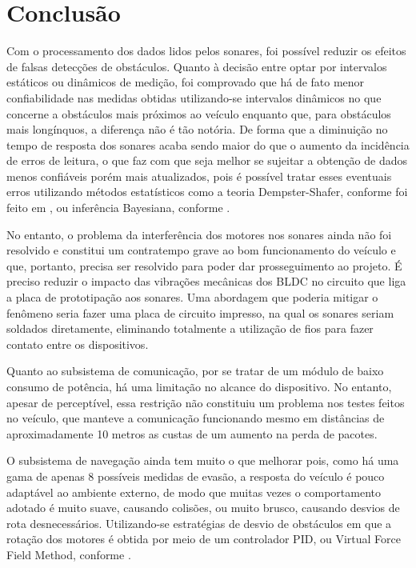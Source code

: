 \chapter{Conclusão}

Com o processamento dos dados lidos pelos sonares, foi possível reduzir os efeitos
de falsas detecções de obstáculos. Quanto à decisão entre optar por intervalos estáticos
ou dinâmicos de medição, foi comprovado que há de fato menor confiabilidade nas medidas
obtidas utilizando-se intervalos dinâmicos no que concerne a obstáculos mais próximos
ao veículo enquanto que, para obstáculos mais longínquos, a diferença não é tão notória.
De forma que a diminuição no tempo de resposta dos sonares acaba sendo maior do que
o aumento da incidência de erros de leitura, o que faz com que seja melhor se sujeitar a
obtenção de dados menos confiáveis porém mais atualizados, pois é possível tratar esses
eventuais erros utilizando métodos estatísticos como a teoria Dempster-Shafer, conforme foi feito em
 , ou inferência Bayesiana, conforme .
 
No entanto, o problema da interferência dos motores nos sonares ainda não foi
resolvido e constitui um contratempo grave ao bom funcionamento do veículo e que,
portanto, precisa ser resolvido para poder dar prosseguimento ao projeto. É preciso reduzir
o impacto das vibrações mecânicas dos BLDC no circuito que liga a placa de prototipação
aos sonares. Uma abordagem que poderia mitigar o fenômeno seria fazer uma placa de
circuito impresso, na qual os sonares seriam soldados diretamente, eliminando totalmente
a utilização de fios para fazer contato entre os dispositivos.

Quanto ao subsistema de comunicação, por se tratar de um módulo de baixo
consumo de potência, há uma limitação no alcance do dispositivo. No entanto, apesar
de perceptível, essa restrição não constituiu um problema nos testes feitos no veículo,
que manteve a comunicação funcionando mesmo em distâncias de aproximadamente 10
metros as custas de um aumento na perda de pacotes.

O subsistema de navegação ainda tem muito o que melhorar pois, como há uma
gama de apenas 8 possíveis medidas de evasão, a resposta do veículo é pouco adaptável ao
ambiente externo, de modo que muitas vezes o comportamento adotado é muito suave,
causando colisões, ou muito brusco, causando desvios de rota desnecessários. Utilizando-se
estratégias de desvio de obstáculos em que a rotação dos motores é obtida por meio de
um controlador PID, ou Virtual Force Field Method, conforme .




